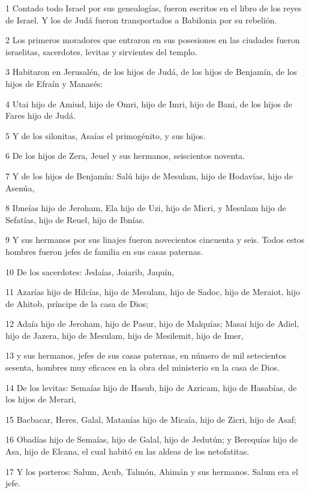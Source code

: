 \par 1 Contado todo Israel por sus genealogías, fueron escritos en el libro de los reyes de Israel. Y los de Judá fueron transportados a Babilonia por su rebelión.
\par 2 Los primeros moradores que entraron en sus posesiones en las ciudades fueron israelitas, sacerdotes, levitas y sirvientes del templo.
\par 3 Habitaron en Jerusalén, de los hijos de Judá, de los hijos de Benjamín, de los hijos de Efraín y Manasés:
\par 4 Utai hijo de Amiud, hijo de Omri, hijo de Imri, hijo de Bani, de los hijos de Fares hijo de Judá.
\par 5 Y de los silonitas, Asaías el primogénito, y sus hijos.
\par 6 De los hijos de Zera, Jeuel y sus hermanos, seiscientos noventa.
\par 7 Y de los hijos de Benjamín: Salú hijo de Mesulam, hijo de Hodavías, hijo de Asenúa,
\par 8 Ibneías hijo de Jeroham, Ela hijo de Uzi, hijo de Micri, y Mesulam hijo de Sefatías, hijo de Reuel, hijo de Ibnías.
\par 9 Y sus hermanos por sus linajes fueron novecientos cincuenta y seis. Todos estos hombres fueron jefes de familia en sus casas paternas.
\par 10 De los sacerdotes: Jedaías, Joiarib, Jaquín,
\par 11 Azarías hijo de Hilcías, hijo de Mesulam, hijo de Sadoc, hijo de Meraiot, hijo de Ahitob, príncipe de la casa de Dios;
\par 12 Adaía hijo de Jeroham, hijo de Pasur, hijo de Malquías; Masai hijo de Adiel, hijo de Jazera, hijo de Mesulam, hijo de Mesilemit, hijo de Imer,
\par 13 y sus hermanos, jefes de sus casas paternas, en número de mil setecientos sesenta, hombres muy eficaces en la obra del ministerio en la casa de Dios.
\par 14 De los levitas: Semaías hijo de Hasub, hijo de Azricam, hijo de Hasabías, de los hijos de Merari,
\par 15 Bacbacar, Heres, Galal, Matanías hijo de Micaía, hijo de Zicri, hijo de Asaf;
\par 16 Obadías hijo de Semaías, hijo de Galal, hijo de Jedutún; y Berequías hijo de Asa, hijo de Elcana, el cual habitó en las aldeas de los netofatitas.
\par 17 Y los porteros: Salum, Acub, Talmón, Ahimán y sus hermanos. Salum era el jefe.
